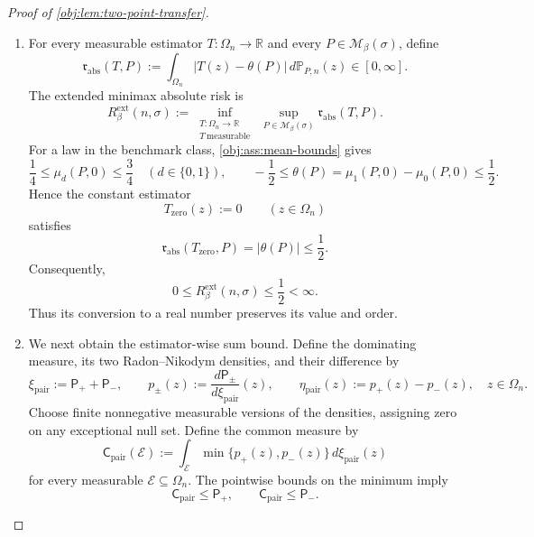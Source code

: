 \documentclass[11pt]{article}
\begin{document}
\begin{proof}[Proof of \cref{obj:lem:two-point-transfer}]
\begin{enumerate}
\item
For every measurable estimator \(T:\Omega_n\to\mathbb R\) and every \(P\in\mathcal M_\beta(\sigma)\), define
\[
\mathfrak r_{\mathrm{abs}}(T,P)
:=
\int_{\Omega_n}|T(z)-\theta(P)|\,d\mathbb P_{P,n}(z)
\in[0,\infty].
\]
The extended minimax absolute risk is
\[
R^{\mathrm{ext}}_\beta(n,\sigma)
:=
\inf_{\substack{T:\Omega_n\to\mathbb R\\T\ \mathrm{measurable}}}
\ \sup_{P\in\mathcal M_\beta(\sigma)}
\mathfrak r_{\mathrm{abs}}(T,P).
\]
For a law in the benchmark class, \cref{obj:ass:mean-bounds} gives
\[
\frac14\le\mu_d(P,0)\le\frac34
\quad(d\in\{0,1\}),
\qquad
-\frac12
\le
\theta(P)=\mu_1(P,0)-\mu_0(P,0)
\le\frac12.
\]
Hence the constant estimator
\[
T_{\mathrm{zero}}(z):=0
\qquad(z\in\Omega_n)
\]
satisfies
\[
\mathfrak r_{\mathrm{abs}}(T_{\mathrm{zero}},P)
=
|\theta(P)|
\le\frac12.
\]
Consequently,
\[
0\le R^{\mathrm{ext}}_\beta(n,\sigma)\le\frac12<\infty.
\]
Thus its conversion to a real number preserves its value and order.

\item
We next obtain the estimator-wise sum bound. Define the dominating measure, its two Radon--Nikodym densities, and their difference by
\[
\xi_{\mathrm{pair}}:=\mathsf P_++\mathsf P_-,
\qquad
p_\pm(z):=\frac{d\mathsf P_\pm}{d\xi_{\mathrm{pair}}}(z),
\qquad
\eta_{\mathrm{pair}}(z):=p_+(z)-p_-(z),
\quad z\in\Omega_n.
\]
Choose finite nonnegative measurable versions of the densities, assigning zero on any exceptional null set. Define the common measure by
\[
\mathsf C_{\mathrm{pair}}(\mathcal E)
:=
\int_{\mathcal E}\min\{p_+(z),p_-(z)\}\,d\xi_{\mathrm{pair}}(z)
\]
for every measurable \(\mathcal E\subseteq\Omega_n\). The pointwise bounds on the minimum imply
\[
\mathsf C_{\mathrm{pair}}\le\mathsf P_+,
\qquad
\mathsf C_{\mathrm{pair}}\le\mathsf P_-.
\]


\end{enumerate}
\end{proof}
\end{document}
